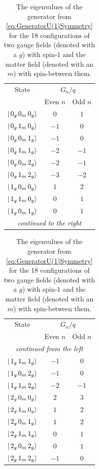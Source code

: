 \documentclass[../main.tex]{subfiles} %
\begin{document}
\begin{table}[t]
    \centering
    \begin{tabular}{|c|c|c|}
        \hline
        State & \multicolumn{2}{c|}{$G_n / q$} \\
         & Even $n$ & Odd $n$ \\ \hline
        $\ket{\, 0_g\, 0_m\, 0_g}$ & $0$ & $1$ \\ \hline
        $\ket{\, 0_g\, 1_m\, 0_g}$ & $-1$ & $0$ \\ \hline
        $\ket{\, 0_g\, 0_m\, 1_g}$ & $-1$ & $0$ \\ \hline
        $\ket{\, 0_g\, 1_m\, 1_g}$ & $-2$ & $-1$ \\ \hline
        $\ket{\, 0_g\, 0_m\, 2_g}$ & $-2$ & $-1$ \\ \hline
        $\ket{\, 0_g\, 1_m\, 2_g}$ & $-3$ & $-2$ \\ \hline
        $\ket{\, 1_g\, 0_m\, 0_g}$ & $1$ & $2$ \\ \hline
        $\ket{\, 1_g\, 1_m\, 0_g}$ & $0$ & $1$ \\ \hline
        $\ket{\, 1_g\, 0_m\, 1_g}$ & $0$ & $1$ \\ \hline
        \multicolumn{3}{|c|}{\textsl{continued to the right}} \\ \hline
    \end{tabular}
    \hfill
    \begin{tabular}{|c|c|c|}
        \hline
        State & \multicolumn{2}{c|}{$G_n / q$} \\
         & Even $n$ & Odd $n$ \\ \hline
        \multicolumn{3}{|c|}{\textsl{continued from the left}} \\ \hline
        $\ket{\, 1_g\, 1_m\, 1_g}$ & $-1$ & $0$ \\ \hline
        $\ket{\, 1_g\, 0_m\, 2_g}$ & $-1$ & $0$ \\ \hline
        $\ket{\, 1_g\, 1_m\, 2_g}$ & $-2$ & $-1$ \\ \hline
        $\ket{\, 2_g\, 0_m\, 0_g}$ & $2$ & $3$ \\ \hline
        $\ket{\, 2_g\, 1_m\, 0_g}$ & $1$ & $2$ \\ \hline
        $\ket{\, 2_g\, 0_m\, 1_g}$ & $1$ & $2$ \\ \hline
        $\ket{\, 2_g\, 1_m\, 1_g}$ & $0$ & $1$ \\ \hline
        $\ket{\, 2_g\, 0_m\, 2_g}$ & $0$ & $1$ \\ \hline
        $\ket{\, 2_g\, 1_m\, 2_g}$ & $-1$ & $0$ \\ \hline
    \end{tabular}
    \caption{The eigenvalues of the generator from \cref{eq:GeneratorU(1)Symmetry} for the 18 configurations of two gauge fields (denoted with a $g$) with spin-$1$ and the matter field (denoted with an $m$) with spin-\half between them.}
    \label{tab:EigenvaluesOfGenerator}
\end{table}




\end{document}
